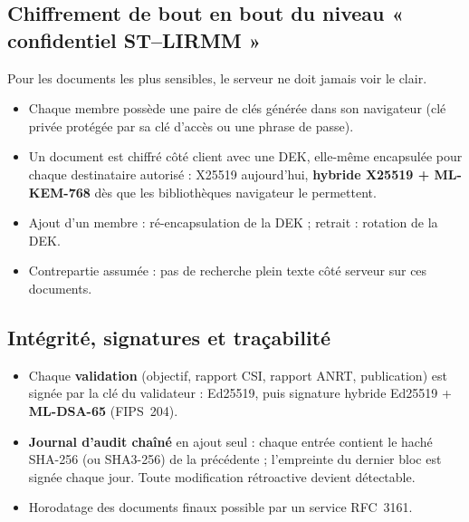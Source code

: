 \documentclass[11pt,a4paper]{article}
\begin{document}
\subsection{Chiffrement de bout en bout du niveau « confidentiel ST--LIRMM »}
Pour les documents les plus sensibles, le serveur ne doit jamais voir le clair.
\begin{itemize}
  \item Chaque membre possède une paire de clés générée dans son navigateur (clé
  privée protégée par sa clé d'accès ou une phrase de passe).
  \item Un document est chiffré côté client avec une DEK, elle-même encapsulée pour
  chaque destinataire autorisé : X25519 aujourd'hui, \textbf{hybride X25519 +
  ML-KEM-768} dès que les bibliothèques navigateur le permettent.
  \item Ajout d'un membre : ré-encapsulation de la DEK ; retrait : rotation de la DEK.
  \item Contrepartie assumée : pas de recherche plein texte côté serveur sur ces
  documents.
\end{itemize}

\subsection{Intégrité, signatures et traçabilité}
\begin{itemize}
  \item Chaque \textbf{validation} (objectif, rapport CSI, rapport ANRT, publication)
  est signée par la clé du validateur : Ed25519, puis signature hybride Ed25519 +
  \textbf{ML-DSA-65} (FIPS~204).
  \item \textbf{Journal d'audit chaîné} en ajout seul : chaque entrée contient le
  haché SHA-256 (ou SHA3-256) de la précédente ; l'empreinte du dernier bloc est
  signée chaque jour. Toute modification rétroactive devient détectable.
  \item Horodatage des documents finaux possible par un service RFC~3161.
\end{itemize}
\end{document}
